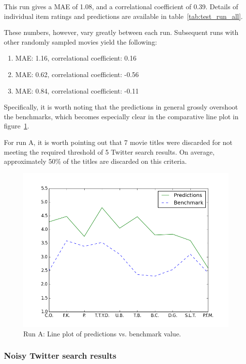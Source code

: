 This run gives a MAE of 1.08, and a correlational coefficient of 0.39. Details of individual item ratings and predictions are available in table~\ref{tab:test_run_all}.

These numbers, however, vary greatly between each run. Subsequent runs with other randomly sampled movies yield the following:

\begin{enumerate}
  \item MAE: 1.16, correlational coefficient: 0.16
  \item MAE: 0.62, correlational coefficient: -0.56
  \item MAE: 0.84, correlational coefficient: -0.11
\end{enumerate}

Specifically, it is worth noting that the predictions in general grossly overshoot the benchmarks, which becomes especially clear in the comparative line plot in figure~\ref{fig:predictions_benchmark_rand}.

For run A, it is worth pointing out that 7 movie titles were discarded for not meeting the required threshold of 5 Twitter search results. On average, approximately 50\% of the titles are discarded on this criteria.

\begin{figure}[h]
  \centering
    \includegraphics[width=.8\textwidth]{Figures/plots/predictions_benchmark_rand}
  \caption{Run A: Line plot of predictions vs. benchmark value.}
  \label{fig:predictions_benchmark_rand}
\end{figure}

\subsubsection{Noisy Twitter search results}


